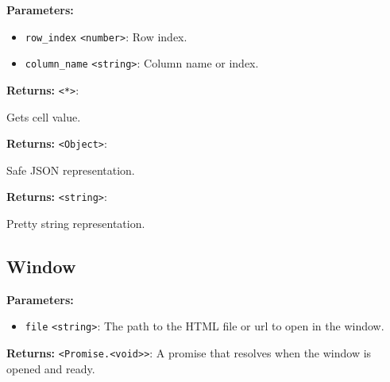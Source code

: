 \documentclass[12pt,a4paper]{article}
\begin{document}
\vspace{5mm}
\noindent {}


\noindent \textbf{Parameters:}
\begin{itemize}
  \item \texttt{row\_index} \texttt{<number>}: Row index.
  \item \texttt{column\_name} \texttt{<string>}: Column name or index.
\end{itemize}

\noindent \textbf{Returns:} \texttt{<*>}:

\noindent Gets cell value.

\vspace{5mm}
\noindent {}


\noindent \textbf{Returns:} \texttt{<Object>}:

\noindent Safe JSON representation.

\vspace{5mm}
\noindent {}


\noindent \textbf{Returns:} \texttt{<string>}:

\noindent Pretty string representation.


\subsection{Window}
\vspace{5mm}
\noindent {}


\noindent \textbf{Parameters:}
\begin{itemize}
  \item \texttt{file} \texttt{<string>}: The path to the HTML file or url to open in the window.
\end{itemize}

\noindent \textbf{Returns:} \texttt{<Promise.<void>>}: A promise that resolves when the window is opened and ready.
\end{document}
